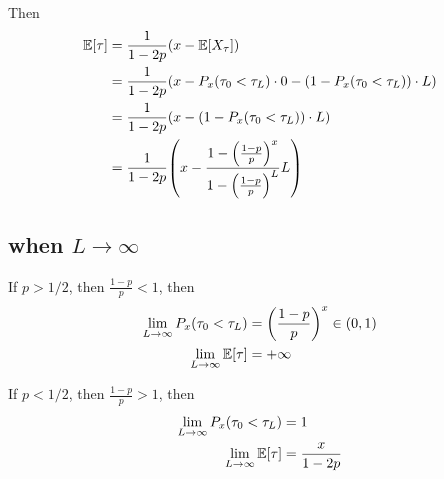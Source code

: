 \documentclass{article}
\begin{document}
Then
\begin{align*}
	\Exp[\tau]
	&= \frac{1}{1-2p} (x - \Exp[X_\tau]) \\
	&= \frac{1}{1-2p} (x - P_x(\tau_0 < \tau_L) \cdot 0 - (1 - P_x(\tau_0 < \tau_L)) \cdot L) \\
	&= \frac{1}{1-2p} (x - (1 - P_x(\tau_0 < \tau_L)) \cdot L) \\
	&= \frac{1}{1-2p} \tuple*{x -  \frac{1 - \tuple*{\frac{1-p}{p}}^x}{1 - \tuple*{\frac{1-p}{p}}^L} L}
\end{align*}

\subsection{when $L \to \infty$}

If $p > 1/2$, then $\frac{1-p}{p} < 1$, then
\begin{align*}
	\lim_{L \to \infty} P_x(\tau_0 < \tau_L) &= \tuple*{\frac{1-p}{p}}^x \in (0, 1)\\
	\lim_{L \to \infty} \Exp[\tau] &= +\infty
\end{align*}

If $p < 1/2$, then $\frac{1-p}{p} > 1$, then
\begin{align*}
	\lim_{L \to \infty} P_x(\tau_0 < \tau_L) &= 1 \\
	\lim_{L \to \infty} \Exp[\tau] &= \frac{x}{1-2p}
\end{align*}
\end{document}
